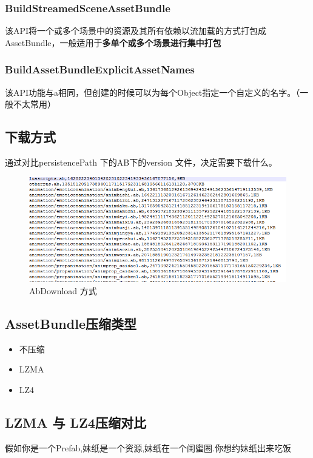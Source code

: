 \documentclass[UTF8,a4paper,12pt]{ctexbook}
\begin{document}
			\subsubsection{BuildStreamedSceneAssetBundle}
				该API将一个或多个场景中的资源及其所有依赖以流加载的方式打包成AssetBundle，一般适用于\textbf{多单个或多个场景进行集中打包}
				
				
			\subsubsection{BuildAssetBundleExplicitAssetNames}
				该API功能与a相同，但创建的时候可以为每个Object指定一个自定义的名字。（一般不太常用）
				
		\subsection{下载方式}
			通过对比persistencePath 下的AB下的version 文件，决定需要下载什么。
			\begin{figure}[H]
				\centering
				\includegraphics[scale=0.45]{AbDownload}
				\caption{AbDownload 方式}
			\end{figure}
		
		\subsection{AssetBundle压缩类型}
			\begin{itemize}
				\item 不压缩
				\item LZMA
				\item LZ4
			\end{itemize}	
			
			\subsection{LZMA 与 LZ4压缩对比}
				假如你是一个Prefab,妹纸是一个资源,妹纸在一个闺蜜圈.你想约妹纸出来吃饭
			
\end{document}
